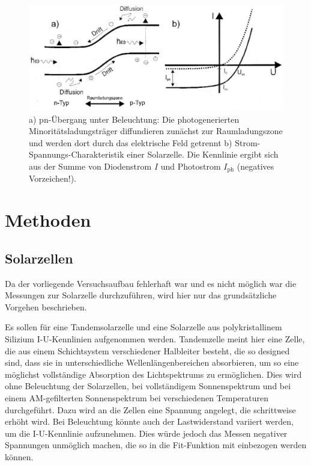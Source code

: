 \documentclass[
	a4paper,
	12pt,
	pagesize,
	ngerman
]{scrartcl}
\begin{document}
	\begin{figure}[H]
			\includegraphics[width= 0.8 \linewidth]{img/photodiode} %
			\caption{
			a) pn-Übergang unter Beleuchtung: Die photogenerierten Minoritätsladungsträger diffundieren zunächst zur Raumladungszone und werden dort durch das elektrische Feld getrennt
			b) Strom-Spannungs-Charakteristik einer Solarzelle. Die Kennlinie ergibt sich aus der Summe von Diodenstrom $ I $ und Photostrom $ I_\text{ph} $ (negatives Vorzeichen!).
			\cite{anleitung}
			}
			\label{fig_photodiode_kennlinie}
	\end{figure}

	\section{Methoden}
	\subsection{Solarzellen}
	Da der vorliegende Versuchsaufbau fehlerhaft war und es nicht möglich war die Messungen zur Solarzelle durchzuführen, wird hier nur das grundsätzliche Vorgehen beschrieben.

	Es sollen für eine Tandemsolarzelle und eine Solarzelle aus polykristallinem Silizium I-U-Kennlinien aufgenommen werden.
	Tandemzelle meint hier eine Zelle, die aus einem Schichtsystem verschiedener Halbleiter besteht, die so designed sind, dass sie in unterschiedliche Wellenlängenbereichen absorbieren, um so eine möglichst vollständige Absorption des Lichtspektrums zu ermöglichen.
	Dies wird ohne Beleuchtung der Solarzellen, bei vollständigem Sonnenspektrum und bei einem AM-gefilterten Sonnenspektrum bei verschiedenen Temperaturen durchgeführt.
	Dazu wird an die Zellen eine Spannung angelegt, die schrittweise erhöht wird.
	Bei Beleuchtung könnte auch der Lastwiderstand variiert werden, um die I-U-Kennlinie aufzunehmen.
	Dies würde jedoch das Messen negativer Spannungen unmöglich machen, die so in die Fit-Funktion mit einbezogen werden können.
\end{document}
